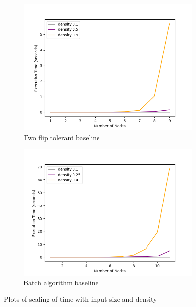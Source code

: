 \documentclass[sigplan,review,anonymous]{acmart}
\begin{document}
{\begin{figure}
    \begin{subfigure}{0.5\linewidth}
      \includegraphics[width=.8\linewidth]{timeVsSize_10_TwoFlipPathChecker.png}
      \caption{Two flip tolerant baseline}
      \label{fig:sfigTwoFlipTvsS}
    \end{subfigure}

    \begin{subfigure}{0.5\linewidth}
      \includegraphics[width=.8\linewidth]{timeVsSize_10_BatchChecker.png}
      \caption{Batch algorithm baseline}
      \label{fig:sfigBatchTvsS}
    \end{subfigure}
    \caption{Plots of scaling of time with input size and density}
    \label{fig:timeVsSize}
\end{figure}

}
\end{document}
